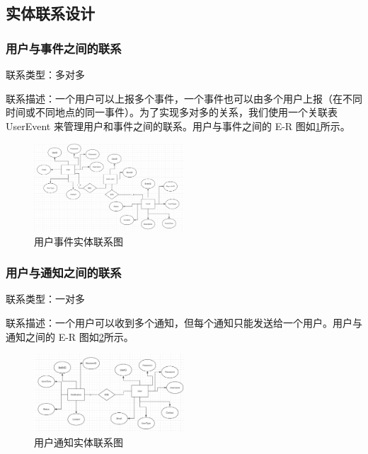 \subsection{实体联系设计}

\subsubsection{用户与事件之间的联系}

联系类型：多对多

联系描述：一个用户可以上报多个事件，一个事件也可以由多个用户上报（在不同时间或不同地点的同一事件）。为了实现多对多的关系，我们使用一个关联表 UserEvent 来管理用户和事件之间的联系。用户与事件之间的 E-R 图如\cref{fig:rela-user-event}所示。

\begin{figure}[htbp]
    \centering
    \includegraphics[width=0.5\textwidth]{figures/db-img-rela-01.png}
    \caption{用户事件实体联系图}
    \label{fig:rela-user-event}
\end{figure}

\subsubsection{用户与通知之间的联系}

联系类型：一对多

联系描述：一个用户可以收到多个通知，但每个通知只能发送给一个用户。用户与通知之间的 E-R 图如\cref{fig:rela-user-notification}所示。

\begin{figure}[htbp]
    \centering
    \includegraphics[width=0.5\textwidth]{figures/db-img-rela-02.png}
    \caption{用户通知实体联系图}
    \label{fig:rela-user-notification}
\end{figure}

